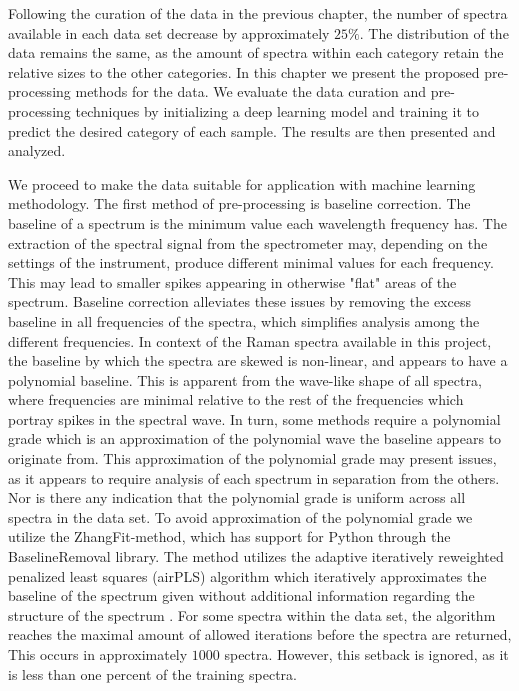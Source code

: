 Following the curation of the data in the previous chapter, the number of spectra available in each data set decrease by approximately $25\%$. The distribution of the data remains the same, as the amount of spectra within each category retain the relative sizes to the other categories. In this chapter we present the proposed pre-processing methods for the data. We evaluate the data curation and pre-processing techniques by initializing a deep learning model and training it to predict the desired category of each sample. The results are then presented and analyzed.

We proceed to make the data suitable for application with machine learning methodology. The first method of pre-processing is baseline correction. The baseline of a spectrum is the minimum value each wavelength frequency has. The extraction of the spectral signal from the spectrometer may, depending on the settings of the instrument, produce different minimal values for each frequency. This may lead to smaller spikes appearing in otherwise "flat" areas of the spectrum. Baseline correction alleviates these issues by removing the excess baseline in all frequencies of the spectra, which simplifies analysis among the different frequencies. In context of the Raman spectra available in this project, the baseline by which the spectra are skewed is non-linear, and appears to have a polynomial baseline. This is apparent from the wave-like shape of all spectra, where frequencies are minimal relative to the rest of the frequencies which portray spikes in the spectral wave. In turn, some methods require a polynomial grade which is an approximation of the polynomial wave the baseline appears to originate from. This approximation of the polynomial grade may present issues, as it appears to require analysis of each spectrum in separation from the others. Nor is there any indication that the polynomial grade is uniform across all spectra in the data set. To avoid approximation of the polynomial grade we utilize the ZhangFit-method, which has support for Python through the BaselineRemoval library. The method utilizes the adaptive iteratively reweighted penalized least squares (airPLS) algorithm which iteratively approximates the baseline of the spectrum given without additional information regarding the structure of the spectrum \cite{zhang2010baseline}. For some spectra within the data set, the algorithm reaches the maximal amount of allowed iterations before the spectra are returned, This occurs in approximately $1000$ spectra. However, this setback is ignored, as it is less than one percent of the training spectra. 

